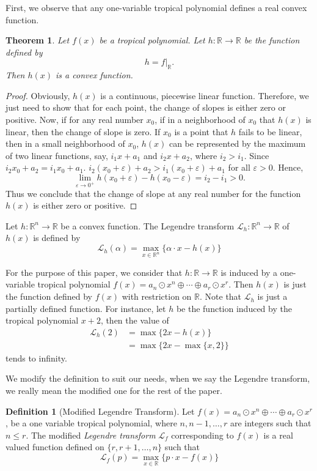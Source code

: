 \documentclass{amsart}
\newtheorem{thm}{Theorem}[section]
\theoremstyle{definition}
\newtheorem{defn}{Definition}[section]
\theoremstyle{remark}
\begin{document}
First, we observe that any one-variable tropical polynomial defines a real convex function.
\begin{thm}
Let $f(x)$ be a tropical polynomial. Let $h\colon {\mathbb{R}} \to {\mathbb{R}}$ be the function defined by
\[
h = f|_{\mathbb{R}}.
\]
Then $h(x)$ is a convex function.
\end{thm}
\begin{proof}
Obviously, $h(x)$ is a continuous, piecewise linear function. Therefore, we just need to show that for each point, the change of slopes is either zero or positive. Now, if for any real number $x_0$, if in a neighborhood of $x_0$ that $h(x)$ is linear, then the change of slope is zero. If $x_0$ is a point that $h$ fails to be linear, then in a small neighborhood of $x_0$, $h(x)$ can be represented by the maximum of two linear functions, say, $i_1 x + a_1$ and $i_2 x + a_2$, where $i_2 > i_1$. Since $i_2 x_0 + a_2 = i_1 x_0 + a_1$. $i_2 (x_0 + \varepsilon) + a_2 > i_1 (x_0 + \varepsilon) + a_1$ for all $\varepsilon > 0$. Hence, 
\[
\lim_{\varepsilon \to 0^+} h(x_0 + \varepsilon) - h(x_0 - \varepsilon) = i_2 - i_1 > 0.
\]
Thus we conclude that the change of slope at any real number for the function $h(x)$ is either zero or positive.
\end{proof}

Let $h \colon {\mathbb{R}}^n \to {\mathbb{R}}$ be a convex function. The Legendre transform ${\mathcal{L}}_h \colon {\mathbb{R}}^n \to {\mathbb{R}}$ of $h(x)$ is defined by 
\[
{\mathcal{L}}_h (\alpha) = \max_{x \in {\mathbb{R}}^n} \{\alpha \cdot x - h(x)\}
\]

For the purpose of this paper, we consider that $h \colon {\mathbb{R}} \to {\mathbb{R}}$ is induced by a one-variable tropical polynomial $f(x) = a_n{\odot} x^n {\oplus} \cdots {\oplus} a_r{\odot} x^r$. Then $h(x)$ is just the function defined by $f(x)$ with restriction on ${\mathbb{R}}$. Note that ${\mathcal{L}}_h$ is just a partially defined function. For instance, let $h$ be the function induced by the tropical polynomial $x+2$, then the value of 
\begin{align*}
{\mathcal{L}}_h(2) 	&= \max\{2x - h(x)\} \\
			&= \max\{2x - \max\{x,2\}\}
\end{align*}
tends to infinity.

We modify the definition to suit our needs, when we say the Legendre transform, we really mean the modified one for the rest of the paper.

\begin{defn}[Modified Legendre Transform]\label{def:legendre}
Let $f(x) = a_n {\odot} x^n {\oplus} \cdots {\oplus} a_r {\odot} x^r$, be a one variable tropical polynomial, where $n, n-1, \ldots, r$ are integers such that $n \leq r$.  The modified \emph{Legendre transform} ${\mathcal{L}}_f$  corresponding to $f(x)$ is a real valued function defined on $\{r, r+1, \ldots, n\}$ such that
\[
{\mathcal{L}}_f(p) = \max_{x \in {\mathbb{R}}} \{p\cdot x - f(x)\}
\]
\end{defn}
\end{document}
